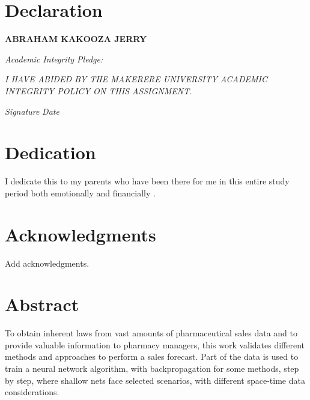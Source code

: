 \documentclass[12pt]{report}
\begin{document}
				



\section*{Declaration}

\textbf{ABRAHAM KAKOOZA JERRY}

\emph{Academic Integrity Pledge:}

\emph{
  I HAVE ABIDED BY THE MAKERERE UNIVERSITY ACADEMIC INTEGRITY POLICY ON THIS
ASSIGNMENT.
}

\emph{Signature} \hspace{0.5cm} \makebox[1.5in]{\hrulefill} \hspace{0.5cm} \emph{Date} \hspace{0.5cm} \makebox[1.5in]{\hrulefill}



\newpage


\section*{Dedication}

\vspace{2cm}
\begin{center}
I dedicate this to my parents who have been there for me in this entire study period both emotionally and financially .
\end{center}



\newpage

\section*{Acknowledgments}

Add acknowledgments. 


\lipsum[2-4]



\newpage



\section*{Abstract}


To obtain inherent laws from vast amounts of pharmaceutical sales data and to provide valuable information to pharmacy managers, this work validates different methods and approaches to perform a sales forecast. Part of the data is used to train a neural network algorithm, with backpropagation for some methods, step by step, where shallow nets face selected scenarios, with different space-time data considerations. 
\end{document}
